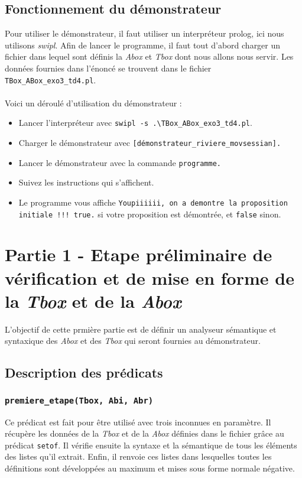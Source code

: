 \documentclass{article}
\newcommand{\code}[1]{\colorbox{light-gray}{\texttt{#1}}}
\begin{document}
\subsection{Fonctionnement du démonstrateur}
Pour utiliser le démonstrateur, il faut utiliser un interpréteur prolog, ici nous utilisons \textit{swipl}. Afin de lancer le programme, il faut tout d'abord charger un fichier dans lequel sont définis la \textit{Abox} et \textit{Tbox} dont nous allons nous servir.
Les données fournies dans l'énoncé se trouvent dans le fichier \code{TBox\_ABox\_exo3\_td4.pl}.
\\\\
\noindent Voici un déroulé d'utilisation du démonstrateur :
\begin{itemize}
    \item Lancer l'interpréteur avec \code{swipl -s .\textbackslash TBox\_ABox\_exo3\_td4.pl}.
    \item Charger le démonstrateur avec \code{[démonstrateur\_riviere\_movsessian].}
    \item Lancer le démonstrateur avec la commande \code{programme.}
    \item Suivez les instructions qui s'affichent.
    \item Le programme vous affiche \code{Youpiiiiii, on a demontre la proposition initiale !!!
true.} si votre proposition est démontrée, et \code{false} sinon.
\end{itemize}



\newpage
\section{Partie 1 - Etape préliminaire de vérification et de mise en forme de la \textit{Tbox} et de la \textit{Abox}}
L'objectif de cette prmière partie est de définir un analyseur sémantique et syntaxique des \textit{Abox} et des \textit{Tbox} qui seront fournies au démonstrateur.

\subsection{Description des prédicats}
\subsubsection{\code{premiere\_etape(Tbox, Abi, Abr)}}

Ce prédicat est fait pour être utilisé avec trois inconnues en paramètre. Il récupère les données de la \textit{Tbox} et de la \textit{Abox} définies dans le fichier grâce au prédicat \code{setof}. Il vérifie ensuite la syntaxe et la sémantique de tous les éléments des listes qu'il extrait. Enfin, il renvoie ces listes dans lesquelles toutes les définitions sont développées au maximum et mises sous forme normale négative.
\end{document}
